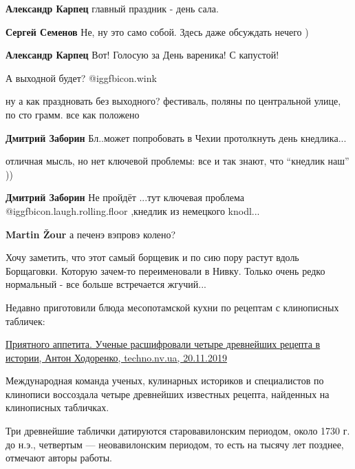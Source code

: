 \begin{itemize}
\begin{itemize} %
\textbf{Александр Карпец} главный праздник - день сала.

\textbf{Сергей Семенов} Не, ну это само собой. Здесь даже обсуждать нечего )

\textbf{Александр Карпец} Вот! Голосую за День вареника! С капустой!
\end{itemize} %

А выходной будет?  @igg{fbicon.wink} 

\begin{itemize} %
ну а как праздновать без выходного? фестиваль, поляны по центральной улице, по сто грамм. все как положено

\textbf{Дмитрий Заборин} Бл..может попробовать в Чехии протолкнуть день кнедлика...


отличная мысль, но нет ключевой проблемы: все и так знают, что \enquote{кнедлик наш} ))

\textbf{Дмитрий Заборин} Не пройдёт ...тут ключевая проблема  @igg{fbicon.laugh.rolling.floor}  ,кнедлик из немецкого knodl...

\textbf{Martin Žour} а печенэ вэпровэ колено?
\end{itemize} %

Хочу заметить, что этот самый борщевик и по сию пору растут вдоль Борщаговки. Которую зачем-то переименовали в Нивку.
Только очень редко нормальный - все больше встречается жгучий...

Недавно приготовили блюда месопотамской кухни по рецептам с клинописных табличек:

\href{https://techno.nv.ua/popscience/priyatnogo-appetita-uchenye-rasshifrovali-chetyre-drevneyshih-recepta-v-istorii-50054528.html}{%
Приятного аппетита. Ученые расшифровали четыре древнейших рецепта в истории, %
Антон Ходоренко, %
techno.nv.ua, 20.11.2019%
}

\begin{multicols}{2}
Международная команда ученых, кулинарных историков и специалистов по клинописи
воссоздала четыре древнейших известных рецепта, найденных на клинописных
табличках.

Три древнейшие таблички датируются старовавилонским периодом, около 1730 г. до
н.э., четвертым — неовавилонским периодом, то есть на тысячу лет позднее,
отмечают авторы работы.


\end{multicols}
\end{itemize}
